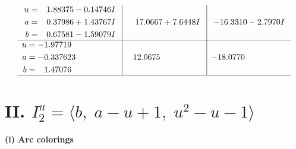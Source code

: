 \documentclass[1p]{elsarticle_modified}
\theoremstyle{definition}
\begin{document}
$$\begin{array}{c|c|c}
\begin{aligned}
u &= \phantom{-}1.88375 - 0.14746 I \\
a &= \phantom{-}0.37986 + 1.43767 I \\
b &= \phantom{-}0.67581 - 1.59079 I\end{aligned}
 & \phantom{-}17.0667 + 7.6448 I & -16.3310 - 2.7970 I \\ \hline\begin{aligned}
u &= -1.97719\phantom{ +0.000000I} \\
a &= -0.337623\phantom{ +0.000000I} \\
b &= \phantom{-}1.47076\phantom{ +0.000000I}\end{aligned}
 & \phantom{-}12.0675\phantom{ +0.000000I} & -18.0770\phantom{ +0.000000I}\\
 \hline 
 \end{array}$$\newpage\newpage\renewcommand{\arraystretch}{1}
\centering \section*{II. $I^u_{2}= \langle b,\;a- u+1,\;u^2- u-1 \rangle$}
\flushleft \textbf{(i) Arc colorings}\\
\end{document}
